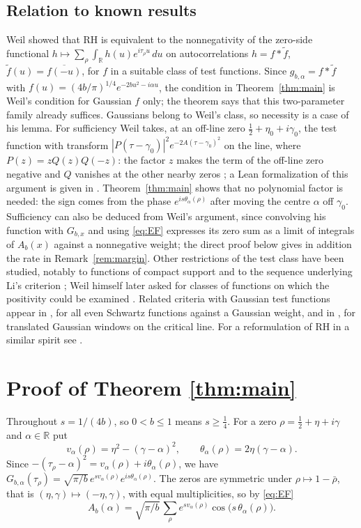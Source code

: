 \documentclass[11pt]{amsart}
\theoremstyle{remark}
\newcommand{\R}{\mathbb{R}}
\begin{document}
\subsection*{Relation to known results}
Weil \cite{Weil} showed that RH is equivalent to the nonnegativity of the zero-side functional
$h\mapsto\sum_\rho\int_\R h(u)e^{i\tau_\rho u}\,du$ on autocorrelations $h=f*\tilde f$,
$\tilde f(u)=\overline{f(-u)}$, for $f$ in a suitable class of test functions. Since $g_{b,\alpha}=f*\tilde f$ with $f(u)=(4b/\pi)^{1/4}e^{-2bu^2-i\alpha u}$, the
condition in Theorem~\ref{thm:main} is Weil's condition for Gaussian $f$ only; the theorem says that this
two-parameter family already suffices. Gaussians belong to Weil's class, so necessity is a case of his lemma.
For sufficiency Weil takes, at an off-line zero $\tfrac12+\eta_0+i\gamma_0$, the test function with transform
$|P(\tau-\gamma_0)|^2e^{-2A(\tau-\gamma_0)^2}$ on the line, where $P(z)=zQ(z)Q(-z)$: the factor $z$ makes the term of
the off-line zero negative and $Q$ vanishes at the other nearby zeros \cite[p.~263]{Weil}; a Lean formalization
of this argument is given in \cite{Lin}. Theorem~\ref{thm:main} shows that no polynomial factor is needed: the
sign comes from the phase $e^{is\theta_\alpha(\rho)}$ after moving the centre $\alpha$ off $\gamma_0$. Sufficiency
can also be deduced from Weil's argument, since convolving his function with $G_{b,x}$ and using \eqref{eq:EF}
expresses its zero sum as a limit of integrals of $A_b(x)$ against a nonnegative weight; the direct proof below
gives in addition the rate in Remark~\ref{rem:margin}. Other restrictions of the test class
have been studied, notably to functions of compact support \cite{Yoshida,Bombieri} and to the sequence
underlying Li's criterion \cite{Li,BL}; Weil himself later asked for classes of functions on which the
positivity could be examined \cite[Commentaire]{Weil}. Related criteria with Gaussian test functions appear
in \cite{Dow}, for all even Schwartz functions against a Gaussian weight, and in \cite{Takahashi}, for translated
Gaussian windows on the critical line. For a reformulation of RH in a similar spirit see \cite{SD}.

\section{Proof of Theorem \ref{thm:main}}
Throughout $s=1/(4b)$, so $0<b\le1$ means $s\ge\tfrac14$. For a zero $\rho=\tfrac12+\eta+i\gamma$ and $\alpha\in\R$ put
\[
v_\alpha(\rho)=\eta^2-(\gamma-\alpha)^2,\qquad\theta_\alpha(\rho)=2\eta(\gamma-\alpha).
\]
Since $-(\tau_\rho-\alpha)^2=v_\alpha(\rho)+i\theta_\alpha(\rho)$, we have
$G_{b,\alpha}(\tau_\rho)=\sqrt{\pi/b}\,e^{sv_\alpha(\rho)}e^{is\theta_\alpha(\rho)}$. The zeros are symmetric under
$\rho\mapsto1-\bar\rho$, that is $(\eta,\gamma)\mapsto(-\eta,\gamma)$, with equal multiplicities, so by \eqref{eq:EF}
\begin{equation}\label{eq:real}
A_b(\alpha)=\sqrt{\pi/b}\,\sum_\rho e^{sv_\alpha(\rho)}\cos\big(s\,\theta_\alpha(\rho)\big).
\end{equation}
\end{document}

